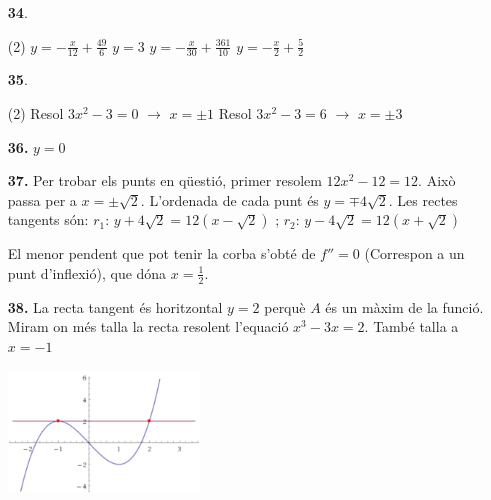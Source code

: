 \documentclass[a4paper, pdf, twoside]{book}
\begin{document}
\begin{enumerate}
\vspace{0.25cm}



 \item[\fontfamily{phv}\selectfont\color{blue}\textbf{34}. ] 
 \begin{tasks}[column-sep=1em, item-indent=1.3333em](2)
	 \task $y=-\frac {x}{12}+\frac {49}{6}$
	 \task $y=3$
	 \task $y=-\frac {x}{30}+\frac {361}{10}$
	 \task $y=-\frac {x}{2}+\frac {5}{2}$
\end{tasks}
\vspace{0.25cm}



 \item[\fontfamily{phv}\selectfont\color{blue}\textbf{35}. ] 
 \begin{tasks}[column-sep=1em, item-indent=1.3333em](2)
	 \task* Resol $3x^2-3=0$ $\rightarrow $ $x=\pm 1$
	 \task* Resol $3x^2-3=6$ $\rightarrow $ $x=\pm 3$
\end{tasks}
\vspace{0.25cm}
\item[\fontfamily{phv}\selectfont\color{blue}\textbf{36. }] 
$y=0$
\vspace{0.25cm}
\item[\fontfamily{phv}\selectfont\color{blue}\textbf{37. }] 
Per trobar els punts en qüestió, primer resolem $12x^2-12=12$. Això passa per a $x=\pm \sqrt {2}$. L'ordenada de cada punt és $y=\mp 4\sqrt {2}$. Les rectes tangents són: $r_1$: $y+4\sqrt {2} = 12(x-\sqrt {2})$ ; $r_2$: $y-4\sqrt {2} = 12(x+\sqrt {2})$ \par El menor pendent que pot tenir la corba s'obté de $f''=0$ (Correspon a un punt d'inflexió), que dóna $x=\frac {1}{2}$. 
\vspace{0.25cm}
\item[\fontfamily{phv}\selectfont\color{blue}\textbf{38. }] 
La recta tangent és horitzontal $y=2$ perquè $A$ és un màxim de la funció. Miram on més talla la recta resolent l'equació $x^{3} - 3x=2$. També talla a $x=-1$\par \includegraphics [width=0.4\textwidth ]{img-sol/t7-tangent}

\end{enumerate}
\end{document}

